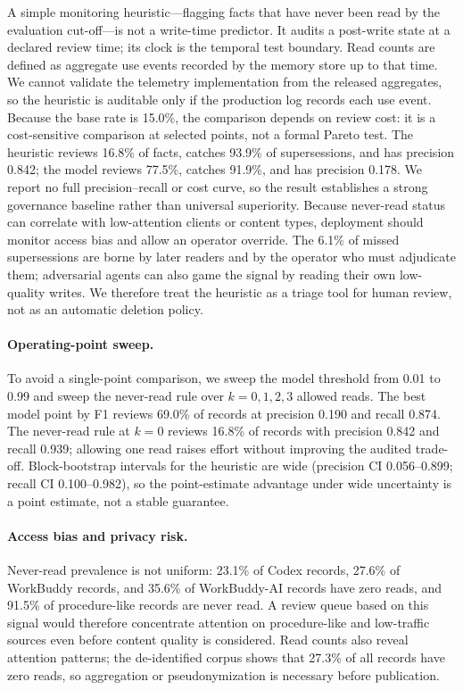 \documentclass[sigconf,nonacm]{acmart}
\begin{document}
A simple monitoring heuristic---flagging facts that have never been read by the evaluation cut-off---is not a write-time predictor. It audits a post-write state at a declared review time; its clock is the temporal test boundary. Read counts are defined as aggregate use events recorded by the memory store up to that time. We cannot validate the telemetry implementation from the released aggregates, so the heuristic is auditable only if the production log records each use event. Because the base rate is 15.0\%, the comparison depends on review cost: it is a cost-sensitive comparison at selected points, not a formal Pareto test. The heuristic reviews 16.8\% of facts, catches 93.9\% of supersessions, and has precision 0.842; the model reviews 77.5\%, catches 91.9\%, and has precision 0.178. We report no full precision--recall or cost curve, so the result establishes a strong governance baseline rather than universal superiority. Because never-read status can correlate with low-attention clients or content types, deployment should monitor access bias and allow an operator override. The 6.1\% of missed supersessions are borne by later readers and by the operator who must adjudicate them; adversarial agents can also game the signal by reading their own low-quality writes. We therefore treat the heuristic as a triage tool for human review, not as an automatic deletion policy.

\paragraph{Operating-point sweep.}
To avoid a single-point comparison, we sweep the model threshold from 0.01 to 0.99 and sweep the never-read rule over $k=0,1,2,3$ allowed reads. The best model point by F1 reviews 69.0\% of records at precision 0.190 and recall 0.874. The never-read rule at $k=0$ reviews 16.8\% of records with precision 0.842 and recall 0.939; allowing one read raises effort without improving the audited trade-off. Block-bootstrap intervals for the heuristic are wide (precision CI 0.056--0.899; recall CI 0.100--0.982), so the point-estimate advantage under wide uncertainty is a point estimate, not a stable guarantee.

\paragraph{Access bias and privacy risk.}
Never-read prevalence is not uniform: 23.1\% of Codex records, 27.6\% of WorkBuddy records, and 35.6\% of WorkBuddy-AI records have zero reads, and 91.5\% of procedure-like records are never read. A review queue based on this signal would therefore concentrate attention on procedure-like and low-traffic sources even before content quality is considered. Read counts also reveal attention patterns; the de-identified corpus shows that 27.3\% of all records have zero reads, so aggregation or pseudonymization is necessary before publication.
\end{document}
